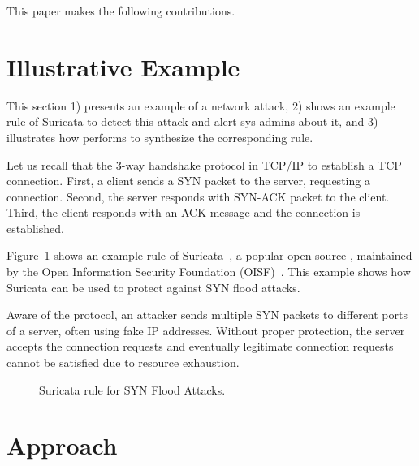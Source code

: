 \documentclass[conference]{IEEEtran}
\begin{document}


This paper makes the following contributions. 

\section{Illustrative Example}
\label{sec:suri-metas-coverage}

This section 1) presents an example of a network attack, 2) shows an
example rule of Suricata to detect this attack and alert sys admins
about it, and 3) illustrates how \tname{} performs to synthesize the
corresponding rule.

Let us recall that the 3-way handshake protocol in TCP/IP to establish
a TCP connection. First, a client sends a SYN packet to the server,
requesting a connection. Second, the server responds with SYN-ACK
packet to the client. Third, the client responds with an ACK message
and the connection is established.

Figure~\ref{fig:synflood-example} shows an
example rule of Suricata~\cite{suricata}, a popular open-source
\nids{}, maintained by the Open Information Security Foundation
(OISF)~\cite{oisf}. This example shows how Suricata can be used to
protect against SYN flood attacks.

Aware of the
protocol, an attacker sends multiple SYN packets to different ports of
a server, often using fake IP addresses. Without proper protection,
the server accepts the connection requests and eventually legitimate
connection requests cannot be satisfied due to resource exhaustion.

\begin{figure}[t]
  
  \caption{Suricata rule for SYN Flood Attacks.}
  \label{fig:synflood-example}
\end{figure}


\section{Approach}

\end{document}

